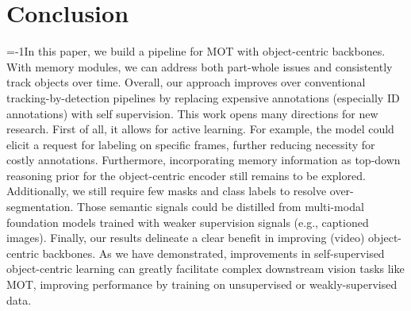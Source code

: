 \section{Conclusion}
\looseness=-1In this paper, we build a pipeline for MOT with object-centric backbones. With memory modules, we can address both part-whole issues and consistently track objects over time. Overall, our approach improves over conventional tracking-by-detection pipelines by replacing expensive annotations (especially ID annotations) with self supervision. This work opens many directions for new research. First of all, it allows for active learning. For example, the model could elicit a request for labeling on specific frames, further reducing necessity for costly annotations.
Furthermore, incorporating memory information as top-down reasoning prior for the object-centric encoder still remains to be explored.
Additionally, we still require few masks and class labels to resolve over-segmentation. Those semantic signals could be distilled from multi-modal foundation models trained with weaker supervision signals (e.g., captioned images). Finally, our results delineate a clear benefit in improving (video) object-centric backbones. 
As we have demonstrated, improvements in self-supervised object-centric learning can greatly facilitate complex downstream vision tasks like MOT, improving performance by training on unsupervised or weakly-supervised data.



